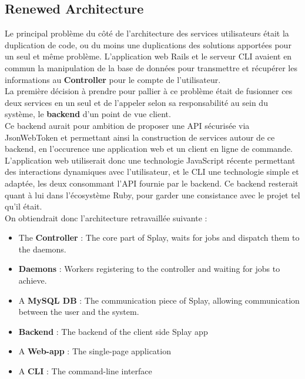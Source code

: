 \documentclass{eplmastersthesis}
\begin{document}
      \subsection{Renewed Architecture}

        Le principal problème du côté de l'architecture des services utilisateurs
        était la duplication de code, ou du moins une duplications des solutions
        apportées pour un seul et même problème. L'application web Rails et le
        serveur CLI avaient en commun la manipulation de la base de données pour
        transmettre et récupérer les informations au \textbf{Controller} pour
        le compte de l'utilisateur.\\

        La première décision à prendre pour pallier à ce problème était de
        fusionner ces deux services en un seul et de l'appeler selon sa responsabilité
        au sein du système, le \textbf{backend} d'un point de vue client.\\
        Ce backend aurait pour ambition de proposer une API sécurisée via
        JsonWebToken et permettant ainsi la construction de services autour de
        ce backend, en l'occurence une application web et un client en ligne
        de commande.\\

        L'application web utiliserait donc une technologie JavaScript récente
        permettant des interactions dynamiques avec l'utilisateur, et le CLI
        une technologie simple et adaptée, les deux consommant l'API fournie
        par le backend. Ce backend resterait quant à lui dans l'écosystème Ruby,
        pour garder une consistance avec le projet tel qu'il était.\\

        On obtiendrait donc l'architecture retravaillée suivante :

        \begin{itemize}
          \item The \textbf{Controller} : The core part of Splay, waits for jobs
          and dispatch them to the daemons.
          \item \textbf{Daemons} : Workers registering to the controller and waiting
          for jobs to achieve.
          \item A \textbf{MySQL DB} : The communication piece of Splay, allowing
          communication between the user and the system.
          \item \textbf{Backend} : The backend of the client side Splay app
          \item A \textbf{Web-app} : The single-page application
          \item A \textbf{CLI} : The command-line interface
        \end{itemize}
\end{document}
